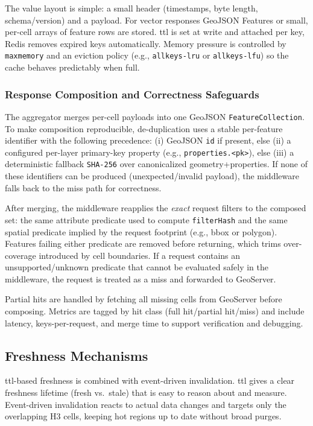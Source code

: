 The value layout is simple: a small header (timestamps, byte length, schema/version) and a payload. For vector responses GeoJSON Features or small, per-cell arrays of feature rows are stored. \ac{ttl} is set at write and attached per key, Redis removes expired keys automatically. Memory pressure is controlled by \texttt{maxmemory} and an eviction policy (e.g., \texttt{allkeys-lru} or \texttt{allkeys-lfu}) so the cache behaves predictably when full.

\subsubsection{Response Composition and Correctness Safeguards}
\label{sec:method-compose-correctness}
The aggregator merges per-cell payloads into one GeoJSON \texttt{FeatureCollection}. To make composition reproducible, de-duplication uses a stable per-feature identifier with the following precedence: (i) GeoJSON \texttt{id} if present, else (ii) a configured per-layer primary-key property (e.g., \texttt{properties.<pk>}), else (iii) a deterministic fallback \texttt{SHA-256} over canonicalized geometry+properties. If none of these identifiers can be produced (unexpected/invalid payload), the middleware falls back to the miss path for correctness.

After merging, the middleware reapplies the \emph{exact} request filters to the composed set: the same attribute predicate used to compute \texttt{filterHash} and the same spatial predicate implied by the request footprint (e.g., \ac{bbox} or polygon). Features failing either predicate are removed before returning, which trims over-coverage introduced by cell boundaries. If a request contains an unsupported/unknown predicate that cannot be evaluated safely in the middleware, the request is treated as a miss and forwarded to GeoServer.

Partial hits are handled by fetching all missing cells from GeoServer before composing. Metrics are tagged by hit class (full hit/partial hit/miss) and include latency, keys-per-request, and merge time to support verification and debugging.

\subsection{Freshness Mechanisms}
\ac{ttl}-based freshness is combined with event-driven invalidation. \ac{ttl} gives a clear freshness lifetime (fresh vs.\ stale) that is easy to reason about and measure. Event-driven invalidation reacts to actual data changes and targets only the overlapping H3 cells, keeping hot regions up to date without broad purges.


